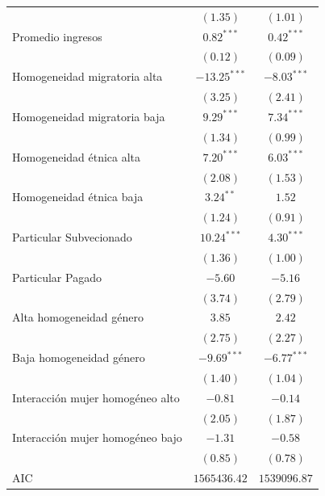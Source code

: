 \documentclass[
]{article}
\begin{document}
\begin{table}
\begin{center}
\begin{tabular}{l c c}
                                 & $(1.35)$       & $(1.01)$       \\
Promedio ingresos                & $0.82^{***}$   & $0.42^{***}$   \\
                                 & $(0.12)$       & $(0.09)$       \\
Homogeneidad migratoria alta     & $-13.25^{***}$ & $-8.03^{***}$  \\
                                 & $(3.25)$       & $(2.41)$       \\
Homogeneidad migratoria baja     & $9.29^{***}$   & $7.34^{***}$   \\
                                 & $(1.34)$       & $(0.99)$       \\
Homogeneidad étnica alta         & $7.20^{***}$   & $6.03^{***}$   \\
                                 & $(2.08)$       & $(1.53)$       \\
Homogeneidad étnica baja         & $3.24^{**}$    & $1.52$         \\
                                 & $(1.24)$       & $(0.91)$       \\
Particular Subvecionado          & $10.24^{***}$  & $4.30^{***}$   \\
                                 & $(1.36)$       & $(1.00)$       \\
Particular Pagado                & $-5.60$        & $-5.16$        \\
                                 & $(3.74)$       & $(2.79)$       \\
Alta homogeneidad género         & $3.85$         & $2.42$         \\
                                 & $(2.75)$       & $(2.27)$       \\
Baja homogeneidad género         & $-9.69^{***}$  & $-6.77^{***}$  \\
                                 & $(1.40)$       & $(1.04)$       \\
Interacción mujer homogéneo alto & $-0.81$        & $-0.14$        \\
                                 & $(2.05)$       & $(1.87)$       \\
Interacción mujer homogéneo bajo & $-1.31$        & $-0.58$        \\
                                 & $(0.85)$       & $(0.78)$       \\
\hline
AIC                              & $1565436.42$   & $1539096.87$   \\

\end{tabular}
\end{center}
\end{table}
\end{document}
